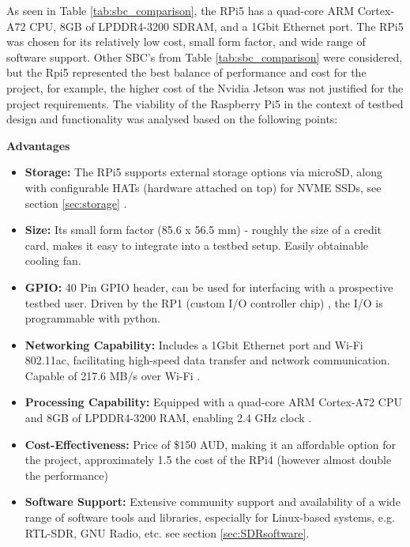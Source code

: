 As seen in Table \ref{tab:sbc_comparison}, the RPi5 has a quad-core ARM Cortex-A72 CPU, 8GB of LPDDR4-3200 SDRAM, and a 1Gbit Ethernet port. The RPi5 was chosen for its relatively low cost, small form factor, and wide range of software support. Other SBC's from Table \ref{tab:sbc_comparison} were considered, but the Rpi5 represented the best balance of performance and cost for the project, for example, the higher cost of the Nvidia Jetson was not justified for the project requirements. The viability of the Raspberry Pi5 in the context of testbed design and functionality was analysed based on the following points:

\noindent \textbf{Advantages}
\begin{itemize}
    \item \textbf{Storage:} The RPi5 supports external storage options via microSD, along with configurable HATs (hardware attached on top) for NVME SSDs, see section \ref{sec:storage} \cite{pimoroni_nvme_base}.
    \item \textbf{Size:} Its small form factor (85.6 x 56.5 mm) - roughly the size of a credit card, makes it easy to integrate into a testbed setup. Easily obtainable cooling fan.
    \item \textbf{GPIO:} 40 Pin GPIO header, can be used for interfacing with a prospective testbed user. Driven by the RP1 (custom I/O controller chip) \cite{core_electronics_rpi5}, the I/O is programmable with python.
    \item \textbf{Networking Capability:} Includes a 1Gbit Ethernet port and Wi-Fi 802.11ac, facilitating high-speed data transfer and network communication. Capable of 217.6 MB/s over Wi-Fi \cite{rpi5_wifi}.
    \item \textbf{Processing Capability:} Equipped with a quad-core ARM Cortex-A72 CPU and 8GB of LPDDR4-3200 RAM, enabling 2.4 GHz clock \cite{core_electronics_rpi5}.
    \item \textbf{Cost-Effectiveness:} Price of \$150 AUD, making it an affordable option for the project, approximately 1.5 the cost of the RPi4 (however almost double the performance) \cite{core_electronics_rpi5}
    \item \textbf{Software Support:} Extensive community support and availability of a wide range of software tools and libraries, especially for Linux-based systems, e.g. RTL-SDR, GNU Radio, etc. see section \ref{sec:SDRsoftware}.
\end{itemize}

